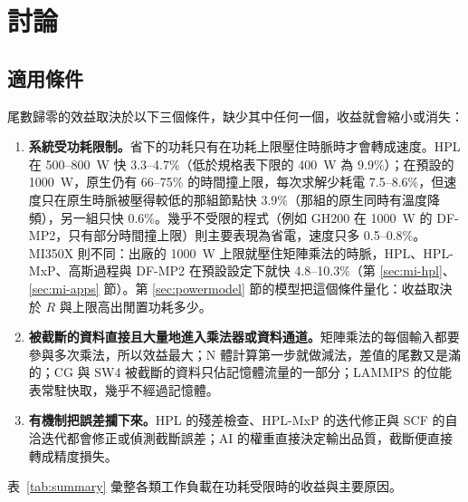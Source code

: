 \chapter{討論}\label{ch:discussion}

\section{適用條件}\label{sec:when}

尾數歸零的效益取決於以下三個條件，缺少其中任何一個，收益就會縮小或消失：

\begin{enumerate}
  \item \textbf{系統受功耗限制。}省下的功耗只有在功耗上限壓住時脈時才會轉成速度。HPL 在 500–800~W 快 3.3–4.7\%（低於規格表下限的 400~W 為 9.9\%）；在預設的 1000~W，原生仍有 66–75\% 的時間撞上限，每次求解少耗電 7.5–8.6\%，但速度只在原生時脈被壓得較低的那組節點快 3.9\%（那組的原生同時有溫度降頻），另一組只快 0.6\%。幾乎不受限的程式（例如 GH200 在 1000~W 的 DF-MP2，只有部分時間撞上限）則主要表現為省電，速度只多 0.5–0.8\%。MI350X 則不同：出廠的 1000~W 上限就壓住矩陣乘法的時脈，HPL、HPL-MxP、高斯過程與 DF-MP2 在預設設定下就快 4.8–10.3\%（第 \ref{sec:mi-hpl}、\ref{sec:mi-apps} 節）。第 \ref{sec:powermodel} 節的模型把這個條件量化：收益取決於 $R$ 與上限高出閒置功耗多少。
  \item \textbf{被截斷的資料直接且大量地進入乘法器或資料通道。}矩陣乘法的每個輸入都要參與多次乘法，所以效益最大；N 體計算第一步就做減法，差值的尾數又是滿的；CG 與 SW4 被截斷的資料只佔記憶體流量的一部分；LAMMPS 的位能表常駐快取，幾乎不經過記憶體。
  \item \textbf{有機制把誤差攔下來。}HPL 的殘差檢查、HPL-MxP 的迭代修正與 SCF 的自洽迭代都會修正或偵測截斷誤差；AI 的權重直接決定輸出品質，截斷便直接轉成精度損失。
\end{enumerate}

表~\ref{tab:summary} 彙整各類工作負載在功耗受限時的收益與主要原因。

